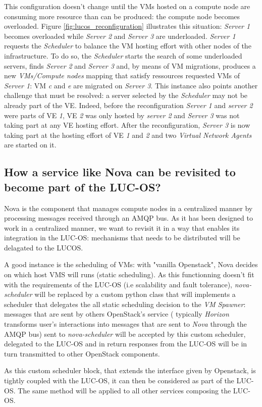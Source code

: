 \newpage

This configuration doesn't change until the VMs hosted on a compute node are
consuming more resource than can be produced: the compute node becomes 
overloaded. Figure \ref{fig:lucos_reconfiguration} illustrates this situation: 
\emph{Server 1} becomes overloaded while \emph{Server 2} and \emph{Server 3} are
underloaded. \emph{Server 1} requests the \emph{Scheduler} to balance the VM 
hosting effort with other nodes of the infrastructure. To do so, the 
\emph{Scheduler} starts the search of some underloaded servers, finds 
\emph{Server 2} and \emph{Server 3} and, by means of VM migrations, produces a 
new \emph{VMs/Compute nodes} mapping that satisfy ressources requested VMs of
\emph{Server 1}: VM \emph{c} and \emph{e} are migrated on \emph{Server 3}. This
instance also points another challenge that must be resolved: a server selected 
by the \emph{Scheduler} may not be already part of the VE. Indeed, before the 
reconfiguration \emph{Server 1} and \emph{server 2} were parts of VE \emph{1},
VE \emph{2} was only hosted by \emph{server 2} and \emph{Server 3} was not 
taking part at any VE hosting effort. After the reconfiguration, \emph{Server 3} 
is now taking part at the hosting effort of VE \emph{1} and \emph{2} and two 
\emph{Virtual Network Agents} are started on it.

\subsection{How a service like Nova can be revisited to become part of the 
LUC-OS?}
\label{sub:sec:nova_lucos}

Nova is the component that manages compute nodes in a centralized manner by
processing messages received through an AMQP bus. As it has been designed to 
work in a centralized manner, we want to revisit it in a way that enables its
integration in the LUC-OS: mechanisms that needs to be distributed will be 
delagated to the LUCOS.

A good instance is the scheduling of VMs: with "vanilla Openstack", Nova decides
on which host VMS will runs (static scheduling). As this functionning doesn't
fit with the requirements of the LUC-OS (i.e scalability and fault tolerance),
\emph{nova-scheduler} will be replaced by a custom python class that will 
implements a scheduler that delegates the all static scheduling decision to the
\emph{VM Spawner}: messages that are sent by others OpenStack's service (
typically \emph{Horizon} transforms user's interactions into messages that are
sent to \emph{Nova} through the AMQP bus) sent to \emph{nova-scheduler} will be
accepted by this custom scheduler, delegated to the LUC-OS and in return 
responses from the LUC-OS will be in turn transmitted to other OpenStack 
components.

As this custom scheduler block, that extends the interface given by Openstack, 
is tightly coupled with the LUC-OS, it can then be considered as part of the
LUC-OS. The same method will be applied to all other services composing the 
LUC-OS.







